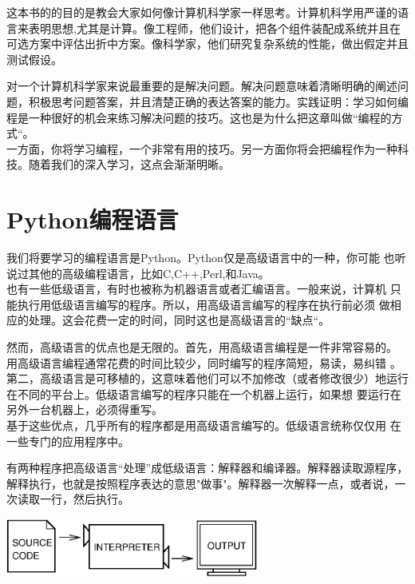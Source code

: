 

这本书的的目的是教会大家如何像计算机科学家一样思考。计算机科学用严谨的语言来表明思想,尤其是计算。像工程师，他们设计，把各个组件装配成系统并且在可选方案中评估出折中方案。像科学家，他们研究复杂系统的性能，做出假定并且测试假设。



对一个计算机科学家来说最重要的是解决问题。解决问题意味着清晰明确的阐述问题，积极思考问题答案，并且清楚正确的表达答案的能力。实践证明：学习如何编程是一种很好的机会来练习解决问题的技巧。这也是为什么把这章叫做“编程的方式“。\\

一方面，你将学习编程，一个非常有用的技巧。另一方面你将会把编程作为一种科技。随着我们的深入学习，这点会渐渐明晰。

\section{Python编程语言}

我们将要学习的编程语言是Python。Python仅是高级语言中的一种，你可能
也听说过其他的高级编程语言，比如C,C++,Perl,和Java。\\

也有一些低级语言，有时也被称为机器语言或者汇编语言。一般来说，计算机
只能执行用低级语言编写的程序。所以，用高级语言编写的程序在执行前必须
做相应的处理。这会花费一定的时间，同时这也是高级语言的“缺点“。\\


然而，高级语言的优点也是无限的。首先，用高级语言编程是一件非常容易的。
用高级语言编程通常花费的时间比较少，同时编写的程序简短，易读，易纠错
。第二，高级语言是可移植的，这意味着他们可以不加修改（或者修改很少）地运行在不同的平台上。低级语言编写的程序只能在一个机器上运行，如果想
要运行在另外一台机器上，必须得重写。\\

基于这些优点，几乎所有的程序都是用高级语言编写的。低级语言统称仅仅用
在一些专门的应用程序中。


有两种程序把高级语言“处理”成低级语言：解释器和编译器。解释器读取源程序，解释执行，也就是按照程序表达的意思"做事"。解释器一次解释一点，或者说，一次读取一行，然后执行。\\

\beforefig
\centerline{\includegraphics[height=0.77in]{figs/interpret.eps}}
\afterfig

